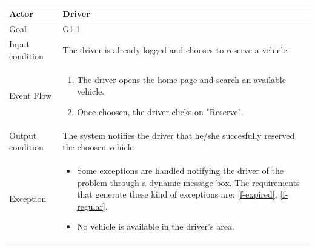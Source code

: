 
\begin{table}[H]
	\begin{center}
		\begin{tabular}{| l | p{} |}
			\hline
			Actor & Driver \\
			\hline
			Goal & G1.1
			\\
			\hline
			Input condition & The driver is already logged and chooses to reserve a vehicle.  \\
			\hline
			Event Flow & \begin{enumerate}
				\item The driver opens the home page and search an available vehicle.
				\item Once choosen, the driver clicks on "Reserve".
			\end{enumerate}
			\\
			\hline
			Output condition & The system notifies the driver that he/she succesfully reserved the choosen vehicle \\
			\hline
			
			Exception &  \begin{itemize}
				\item Some exceptions are handled notifying the driver of the problem through a dynamic message box.				
				The requirements that generate these kind of exceptions are:
				\ref{f-expired},    %
				\ref{f-regular},    %
				\item No vehicle is available in the driver's area.
				\end{itemize}
			\\
			\hline
		\end{tabular}
	\end{center}
\end{table}


